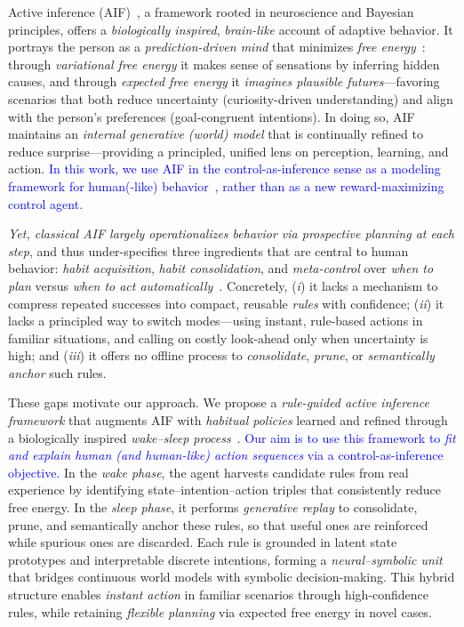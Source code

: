 \documentclass{article} %
\newcommand{\revise}[1]{\textcolor{blue}{#1}}
\begin{document}
Active inference (AIF)~\citep{mazzaglia2022free}, a framework rooted in neuroscience and Bayesian principles, offers a \emph{biologically inspired}, \emph{brain-like} account of adaptive behavior. It portrays the person as a \emph{prediction-driven mind} that minimizes \emph{free energy}~\citep{parr2019generalised, millidge2021whence}: through \emph{variational free energy} it makes sense of sensations by inferring hidden causes, and through \emph{expected free energy} it \emph{imagines plausible futures}—favoring scenarios that both reduce uncertainty (curiosity-driven understanding) and align with the person’s preferences (goal-congruent intentions). In doing so, AIF maintains an \emph{internal generative (world) model} that is continually refined to reduce surprise—providing a principled, unified lens on perception, learning, and action. \revise{In this work, we use AIF in the control-as-inference sense as a modeling framework for human(-like) behavior~\citep{levine2018reinforcement, toussaint2009robot}, rather than as a new reward-maximizing control agent.}

\emph{Yet, classical AIF largely operationalizes behavior via prospective planning at each step}, and thus under-specifies three ingredients that are central to human behavior: \emph{habit acquisition}, \emph{habit consolidation}, and \emph{meta-control} over \emph{when to plan} versus \emph{when to act automatically}~\citep{han2024synergizing, dung2024r}. Concretely, ({\it i}) it lacks a mechanism to compress repeated successes into compact, reusable \emph{rules} with confidence; ({\it ii}) it lacks a principled way to switch modes—using instant, rule-based actions in familiar situations, and calling on costly look-ahead only when uncertainty is high; and ({\it iii}) it offers no offline process to \emph{consolidate}, \emph{prune}, or \emph{semantically anchor} such rules. 

These gaps motivate our approach. We propose a \emph{rule-guided active inference framework} that augments AIF with \emph{habitual policies} learned and refined through a biologically inspired \emph{wake--sleep process}~\citep{hinton1995wake, hewitt2020learning,  ellis2023dreamcoder}. \revise{Our aim is to use this framework to \emph{fit and explain human (and human-like) action sequences} via a control-as-inference objective.} In the \emph{wake phase}, the agent harvests candidate rules from real experience by identifying state--intention--action triples that consistently reduce free energy. In the \emph{sleep phase}, it performs \emph{generative replay} to consolidate, prune, and semantically anchor these rules, so that useful ones are reinforced while spurious ones are discarded. Each rule is grounded in latent state prototypes and interpretable discrete intentions, forming a \emph{neural--symbolic unit} that bridges continuous world models with symbolic decision-making. This hybrid structure enables \emph{instant action} in familiar scenarios through high-confidence rules, while retaining \emph{flexible planning} via expected free energy in novel cases. 
\end{document}
